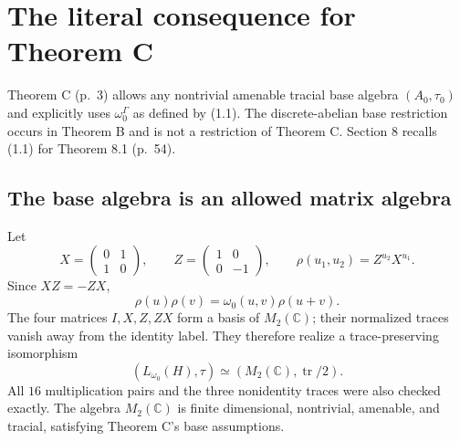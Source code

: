 \documentclass[10pt]{article}
\begin{document}
\section*{The literal consequence for Theorem C}
Theorem C (p. 3) allows any nontrivial amenable tracial base algebra \((A_0,\tau_0)\) and explicitly uses \(\omega_0^\Gamma\) as defined by (1.1). The discrete-abelian base restriction occurs in Theorem B and is not a restriction of Theorem C. Section 8 recalls (1.1) for Theorem 8.1 (p. 54).\par
\subsection*{The base algebra is an allowed matrix algebra}
Let \[X=\begin{pmatrix}0&1\\1&0\end{pmatrix},\qquad
 Z=\begin{pmatrix}1&0\\0&-1\end{pmatrix},\qquad
 \rho(u_1,u_2)=Z^{u_2}X^{u_1}.\] Since \(XZ=-ZX\), \[\rho(u)\rho(v)=\omega_0(u,v)\rho(u+v).\] The four matrices \(I,X,Z,ZX\) form a basis of \(M_2(\mathbb C)\); their normalized traces vanish away from the identity label. They therefore realize a trace-preserving isomorphism \[(L_{\omega_0}(H),\tau)\simeq(M_2(\mathbb C),\operatorname{tr}/2).\] All \(16\) multiplication pairs and the three nonidentity traces were also checked exactly. The algebra \(M_2(\mathbb C)\) is finite dimensional, nontrivial, amenable, and tracial, satisfying Theorem C’s base assumptions.\par
\end{document}
